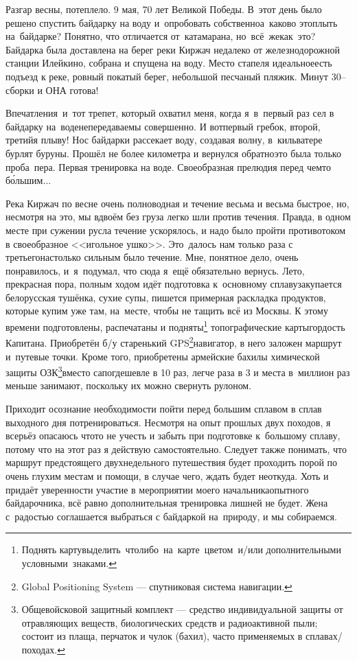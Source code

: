 Разгар весны, потеплело. 9 мая, 70 лет Великой Победы. В~этот день было решено спустить байдарку на воду и~опробовать собственно\mdash а~каково это\mdash плыть на~байдарке? Понятно, что отличается от~катамарана, но~всё~же\mdash как~это? Байдарка была доставлена на берег реки Киржач недалеко от железнодорожной станции Илейкино, собрана и спущена на воду. Место стапеля идеальное\mdash есть подъезд к реке, ровный покатый берег, небольшой песчаный пляжик. Минут 30\thinspace-- сборки и ОНА готова! 

Впечатления~и~тот трепет, который охватил меня, когда я~в~первый раз сел в байдарку на~воде\mdash непередаваемы совершенно. И вот\mdash первый гребок, второй, третий\mdash я плыву! Нос байдарки рассекает воду, создавая волну, в~кильватере бурлят буруны. Прошёл не более километра и вернулся обратно\mdash это была только проба~пера. Первая тренировка на воде. Своеобразная прелюдия перед чем\sdash то б\'{о}льшим$\ldots$
 
Река Киржач по весне очень полноводная и течение весьма и весьма быстрое, но, несмотря на это, мы вдвоём без груза легко шли против течения. Правда, в одном месте при сужении русла течение ускорялось, и надо было пройти противотоком в своеобразное <<игольное ушко>>. Это~далось нам только раза с третьего\mdash настолько сильным было течение. Мне, понятное дело, очень понравилось, и~я~подумал, что сюда я~ещё обязательно вернусь. 
\newpage
Лето, прекрасная пора, полным ходом идёт подготовка к~основному сплаву\mdash закупается белорусская тушёнка, сухие супы, пишется примерная раскладка продуктов, которые купим уже там, на~месте, чтобы не тащить всё из Москвы. К этому времени подготовлены, распечатаны и подняты\footnote[1]{Поднять карту\mdash выделить что\sdash либо на карте цветом и/или дополнительными условными знаками.} топографические карты\mdash гордость Капитана. Приобретён б/у старенький GPS\footnote[2]{Global Positioning System --- спутниковая система навигации.}\sdash навигатор, в него заложен маршрут и~путевые точки. Кроме того, приобретены армейские бахилы химической защиты ОЗК\footnote[3]{Общевойсковой защитный комплект --- средство индивидуальной защиты от отравляющих веществ, биологических средств и радиоактивной пыли; состоит из плаща, перчаток и чулок (бахил), часто применяемых в сплавах/походах.}\mdash вместо сапог\mdash дешевле в 10 раз, легче раза в 3 и места в~миллион раз меньше занимают, поскольку их можно свернуть рулоном.

Приходит осознание необходимости пойти перед большим сплавом в сплав выходного дня потренироваться. Несмотря на опыт прошлых двух походов, я всерьёз опасаюсь что\sdash то не учесть и забыть при подготовке к~большому сплаву, потому что на этот раз я действую самостоятельно. Следует также понимать, что маршрут предстоящего двухнедельного путешествия будет проходить порой по очень глухим местам и помощи, в случае чего, ждать будет неоткуда. Хоть и придаёт уверенности участие в мероприятии моего начальника\mdash опытного байдарочника, всё равно дополнительная тренировка лишней не будет. Жена с~радостью соглашается выбраться с байдаркой на~природу, и мы собираемся.

